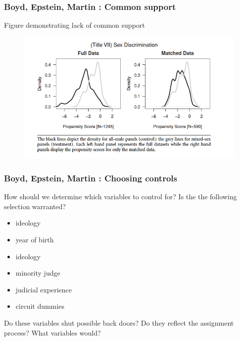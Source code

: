 \documentclass[12pt,english,dvipsnames,aspectratio=169,handout]{beamer}\usepackage[]{graphicx}\usepackage[]{xcolor}
\begin{document}
\begin{frame}
	\frametitle{Boyd, Epstein, Martin \citeyear{boyd_untangling_2010}: Common support}
	\footnotesize
  Figure demonstrating lack of common support
  	 \begin{figure} 
    \includegraphics[height=.6\textheight,keepaspectratio=true]{../04-figures/06/06-w6_density2}
    \end{figure}
\end{frame}


\begin{frame}
	\frametitle{Boyd, Epstein, Martin \citeyear{boyd_untangling_2010}: Choosing controls}
	\footnotesize
	How should we determine which variables to control for? Is the the following selection warranted?
	\begin{itemize} \scriptsize
		\item ideology
		\item year of birth
		\item ideology
		\item minority judge
		\item judicial experience
		\item circuit dummies
	\end{itemize} \footnotesize
	Do these variables shut possible back doors? Do they reflect the assignment process? What variables would?
\end{frame}
\end{document}
